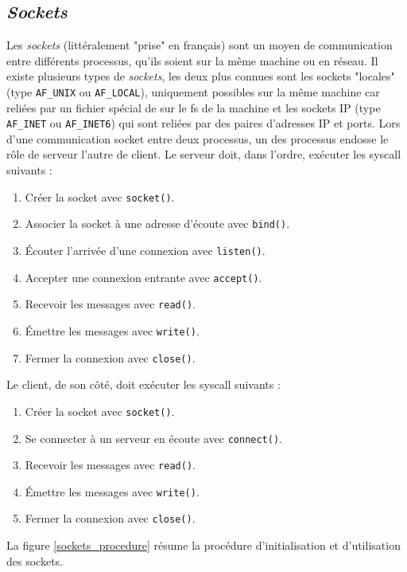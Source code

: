 \documentclass[a4paper, 12pt]{article}
\begin{document}
\subsection{\textit{Sockets}}
Les \textit{sockets} (littéralement "prise" en français) sont un moyen de communication entre 
différents processus, qu'ils soient sur la même machine ou en réseau. Il existe plusieurs types 
de \textit{sockets}, les deux plus connues sont les sockets "locales" (type \texttt{AF_UNIX} ou 
\texttt{AF_LOCAL}), uniquement possibles sur la même machine car reliées par un fichier spécial 
de sur le \acrshort{fs} de la machine et les sockets IP (type \texttt{AF_INET} ou 
\texttt{AF_INET6}) qui sont reliées par des paires d'adresses IP et ports.
Lors d'une communication socket entre deux processus, un des processus endosse le rôle de serveur 
l'autre de client. Le serveur doit, dans l'ordre, exécuter les \acrshort{syscall} suivants : 
\begin{enumerate}
    \item Créer la socket avec \texttt{socket()}.
    \item Associer la socket à une adresse d'écoute avec \texttt{bind()}.
    \item Écouter l'arrivée d'une connexion avec \texttt{listen()}.
    \item Accepter une connexion entrante avec \texttt{accept()}.
    \item Recevoir les messages avec \texttt{read()}.
    \item Émettre les messages avec \texttt{write()}.
    \item Fermer la connexion avec \texttt{close()}.
\end{enumerate}
Le client, de son côté, doit exécuter les \acrshort{syscall} suivants :
\begin{enumerate}
    \item Créer la socket avec \texttt{socket()}.
    \item Se connecter à un serveur en écoute avec \texttt{connect()}.
    \item Recevoir les messages avec \texttt{read()}.
    \item Émettre les messages avec \texttt{write()}.
    \item Fermer la connexion avec \texttt{close()}.
\end{enumerate}
La figure \ref{sockets_procedure} résume la procédure d'initialisation et d'utilisation des sockets.
\end{document}
